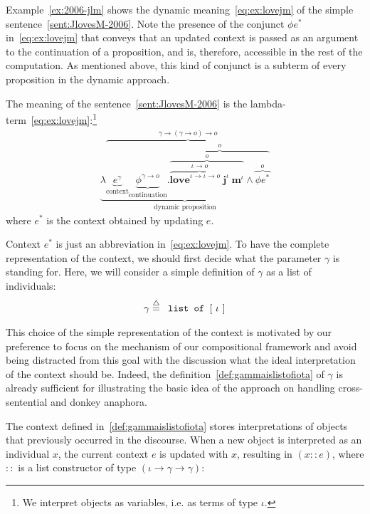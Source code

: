 Example~\ref{ex:2006-jlm} shows the dynamic meaning~\eqref{eq:ex:lovejm} of the simple sentence~\eqref{sent:JlovesM-2006}. Note the presence of the conjunct $\phi e^*$ in~\eqref{eq:ex:lovejm} that conveys that an updated context is passed as an argument to the continuation of a proposition, and is, therefore, accessible in the rest of the computation. As mentioned above, this kind of conjunct is a subterm of every proposition in the dynamic approach.
 \begin{example} \label{ex:2006-jlm} The meaning of the sentence~\eqref{sent:JlovesM-2006} is the lambda-term~\eqref{eq:ex:lovejm}:\footnote{We interpret objects as variables, i.e. as terms of type $\iota$.}
\begin{align}
\underbrace{\lambda \overbrace{\underbrace{e^{\gamma}}_{\text{context}} \underbrace{\phi^{\gamma \rightarrow o}}_{\text{continuation}}.  \overbrace{\overbrace{ \overbrace{\textbf{love}^{\iota \rightarrow \iota \rightarrow o}  \ \textbf{j}^{\iota}}^{\iota \rightarrow o} \ \textbf{m}^{\iota}}^{o} \land \overbrace{\phi e^*}^{o}}^{o}}^{\gamma \rightarrow (\gamma \rightarrow o) \rightarrow o} }_{\text{dynamic proposition}} \label{eq:ex:lovejm}
\end{align}
\indent where  $e^*$ is the context obtained by updating $e$.
\end{example}

 Context $e^*$ is just an abbreviation in~\eqref{eq:ex:lovejm}. To have the complete representation of the context, we should first decide what the parameter $\gamma$ is standing for. Here, we will consider a simple definition of $\gamma$ as a list of individuals:
\begin{align} \label{def:gammaislistofiota}
\gamma \stackrel{{\scriptstyle\triangle}}{=} \texttt{ list of } [ \ \iota \ ]  
\end{align}
 
 This choice of the simple representation of the context is motivated  by our preference to focus on the mechanism of our compositional framework and avoid being distracted from this goal with the discussion what the ideal interpretation of the context should be. Indeed, the definition~\eqref{def:gammaislistofiota} of $\gamma$ is already sufficient for illustrating the basic idea of the approach on handling cross-sentential and donkey anaphora.
 
The context defined in~\eqref{def:gammaislistofiota}  stores interpretations of objects that previously occurred in the discourse. When a new object is interpreted as an individual $x$, the current context $e$ is updated with $x$, resulting in $(x::e)$, where $::$ is a list constructor of type $(\iota \rightarrow \gamma \rightarrow \gamma)$:

